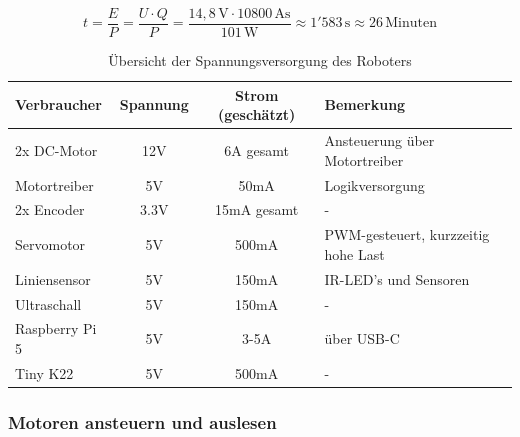 \begin{equation}
    t = \frac{E}{P} = \frac{U \cdot Q}{P} = \frac{14{,}8\,\text{V} \cdot 10800\,\text{As}}{101\,\text{W}} \approx 1{'}583\,\text{s} \approx 26\,\text{Minuten} 
    \label{eq:Energieverbrauch}
\end{equation}



\newpage

\begin{table}[h!]
\centering
\renewcommand{\arraystretch}{1.3}
\begin{tabular}{@{} l c c l @{}}
\toprule
\textbf{Verbraucher}         & \textbf{Spannung} & \textbf{Strom (geschätzt)} & \textbf{Bemerkung} \\
\midrule
2x DC-Motor                  & 12V              & 6A gesamt               & Ansteuerung über Motortreiber \\

Motortreiber & 5V               &  50mA              & Logikversorgung \\

2x Encoder & 3.3V               &  15mA gesamt             &- \\

Servomotor                   & 5V               &  500mA                 & PWM-gesteuert, kurzzeitig hohe Last \\

Liniensensor         & 5V               &  150mA                  & IR-LED's und Sensoren \\

Ultraschall & 5V               &  150mA              &- \\

Raspberry Pi 5              & 5V               & 3-5A                      & über USB-C \\

Tiny K22             & 5V               & 500mA                      & - \\

\bottomrule
\end{tabular}
\caption{Übersicht der Spannungsversorgung des Roboters}
\label{tab:spannungsversorgung}
\end{table}



\subsubsection{Motoren ansteuern und auslesen}
\label{motoren-encoder}


